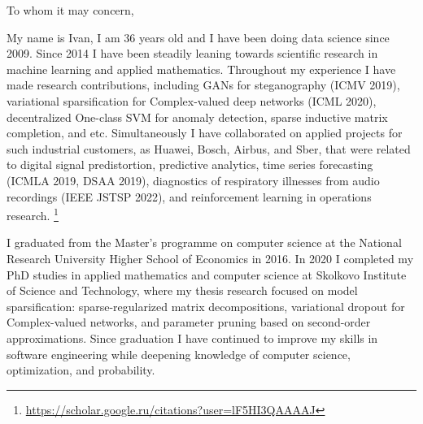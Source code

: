 \documentclass[12pt]{letter}
\begin{document}
\thispagestyle{empty}

%

\vspace{1.5cm}

\begin{minipage}{0.5\linewidth}
To whom it may concern, \par
\end{minipage} \par\bigskip

My name is Ivan, I am 36 years old and I have been doing data science since 2009. Since 2014 I have been steadily leaning towards scientific research in machine learning and applied mathematics. Throughout my experience I have made research contributions, including GANs for steganography (ICMV 2019), variational sparsification for Complex-valued deep networks (ICML 2020), decentralized One-class SVM for anomaly detection, sparse inductive matrix completion, and etc. Simultaneously I have collaborated on applied projects for such industrial customers, as Huawei, Bosch, Airbus, and Sber, that were related to digital signal predistortion, predictive analytics, time series forecasting (ICMLA 2019, DSAA 2019), diagnostics of respiratory illnesses from audio recordings (IEEE JSTSP 2022), and reinforcement learning in operations research.%
\footnote{
    \url{https://scholar.google.ru/citations?user=lF5HI3QAAAAJ}
}
\par\medskip

I graduated from the Master's programme on computer science at the National Research University Higher School of Economics in 2016. In 2020 I completed my PhD studies in applied mathematics and computer science at Skolkovo Institute of Science and Technology, where my thesis research focused on model sparsification: sparse-regularized matrix decompositions, variational dropout for Complex-valued networks, and parameter pruning based on second-order approximations. Since graduation I have continued to improve my skills in software engineering while deepening knowledge of computer science, optimization, and probability.
\par\medskip
\end{document}
